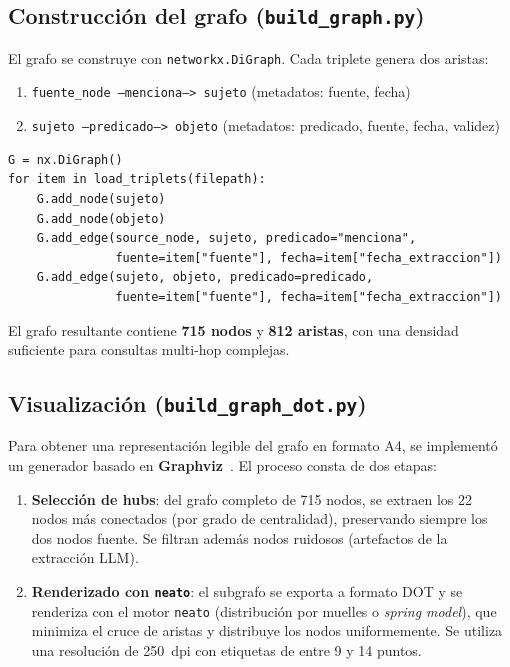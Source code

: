 \documentclass[12pt,a4paper]{article}
\begin{document}
\subsection{Construcción del grafo (\texttt{build\_graph.py})}

El grafo se construye con \texttt{networkx.DiGraph}. Cada triplete genera dos aristas:

\begin{enumerate}
  \item \texttt{fuente\_node --menciona--> sujeto} (metadatos: fuente, fecha)
  \item \texttt{sujeto --predicado--> objeto} (metadatos: predicado, fuente, fecha, validez)
\end{enumerate}

\begin{lstlisting}[caption={Construcción del grafo dirigido}, label={lst:graph}]
G = nx.DiGraph()
for item in load_triplets(filepath):
    G.add_node(sujeto)
    G.add_node(objeto)
    G.add_edge(source_node, sujeto, predicado="menciona",
               fuente=item["fuente"], fecha=item["fecha_extraccion"])
    G.add_edge(sujeto, objeto, predicado=predicado,
               fuente=item["fuente"], fecha=item["fecha_extraccion"])
\end{lstlisting}

El grafo resultante contiene \textbf{715 nodos} y \textbf{812 aristas}, con una densidad suficiente para consultas multi-hop complejas.

\subsection{Visualización (\texttt{build\_graph\_dot.py})}

Para obtener una representación legible del grafo en formato A4, se implementó un generador basado en \textbf{Graphviz}~\cite{graphviz}. El proceso consta de dos etapas:

\begin{enumerate}
  \item \textbf{Selección de hubs}: del grafo completo de 715 nodos, se extraen los 22 nodos más conectados (por grado de centralidad), preservando siempre los dos nodos fuente. Se filtran además nodos ruidosos (artefactos de la extracción LLM).
  \item \textbf{Renderizado con \texttt{neato}}: el subgrafo se exporta a formato DOT y se renderiza con el motor \texttt{neato} (distribución por muelles o \textit{spring model}), que minimiza el cruce de aristas y distribuye los nodos uniformemente. Se utiliza una resolución de 250~dpi con etiquetas de entre 9 y 14 puntos.
\end{enumerate}
\end{document}
